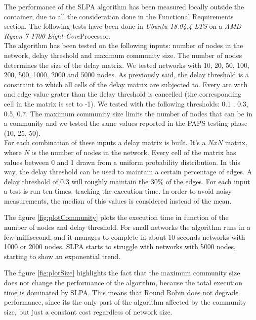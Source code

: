 The performance of the SLPA algorithm has been measured locally outside the container, due to 
all the consideration done in the Functional Requirements section.
The following tests have been done in \textit{Ubuntu 18.04.4 LTS} on a \textit{AMD Ryzen 7 1700 Eight-Core}Processor.
\\
The algorithm has been tested on the following inputs: number of nodes in the network, delay threshold and maximum community size.
The number of nodes determines the size of the delay matrix. We tested networks with 10, 20, 50, 100, 200, 500, 1000, 2000 and 5000 nodes.
As previously said, the delay threshold is a constraint to which all cells of the delay matrix are subjected to. Every arc with and edge value grater than the delay threshold
is cancelled (the corresponding cell in the matrix is set to -1). We tested with the following thresholds: 0.1 , 0.3, 0.5, 0.7.
The maximum community size limits the number of nodes that can be in a community and we tested the same values reported in the PAPS testing phase
(10, 25, 50).\\
For each combination of these inputs a delay matrix is built. It's a $NxN$ matrix, where $N$ is the number of nodes in the network.
Every cell of the matrix has values between 0 and 1 drawn from a uniform probability distribution. In this way, the delay threshold
can be used to maintain a certain percentage of edges.
A delay threshold of 0.3 will roughly maintain the 30\% of the edges.
For each input a test is run ten times, tracking the execution time. In order to avoid noisy measurements,
the median of this values is considered instead of the mean.
\par
The figure \ref{fig:plotCommunity} plots the execution time in function of the number of nodes and delay threshold.
For small networks the algorithm runs in a few millisecond, and it manages to complete in about 10 seconds networks
with 1000 or 2000 nodes. SLPA starts to struggle with networks with 5000 nodes, starting to show an exponential trend.
\par
The figure \ref{fig:plotSize} highlights the fact that the maximum community size does not change the performance 
of the algorithm, because the total execution time is dominated by SLPA. This means that Round Robin does not
degrade performance, since its the only part of the algorithm affected by the community size, but just a constant cost regardless
of network size.